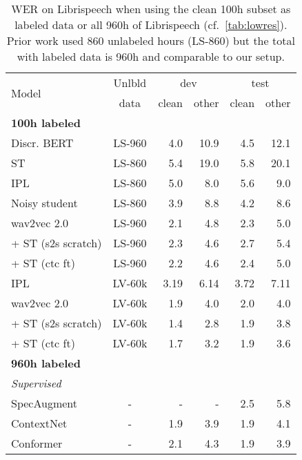 \documentclass{article}
\newcommand{\wvpp}{wav2vec 2.0}
\newcommand{\libri}{Librispeech}
\newcommand{\voxsz}{LV-60k}
\newcommand{\librisz}{LS-960}
\newcommand{\libriunsz}{LS-860}
\begin{document}
\begin{table}[t]
\centering 
\caption{
WER on \libri{} when using the clean 100h subset as labeled data or all 960h of \libri{} (cf.~\autoref{tab:lowres}).
Prior work used 860 unlabeled hours (LS-860) but the total with labeled data is 960h and comparable to our setup.
}
\label{tab:highres}
\begin{tabular}{lcrrrr}
\toprule
\multirow{2}{*}{Model} & Unlbld & \multicolumn{2}{c}{dev} & \multicolumn{2}{c}{test} \\
\cline{3-4}\cline{5-6} 
{} & data & clean & other & clean & other \\
\midrule
\midrule
\multicolumn{6}{l}{\textbf{100h labeled}} \\
Discr. BERT~\cite{baevski2019effectiveness} & \librisz{} & 4.0 & 10.9 & 4.5 & 12.1 \\
ST~\cite{kahn2020st} & \libriunsz{} & 5.4 & 19.0 & 5.8 & 20.1 \\
IPL~\cite{xu2020iterative} & \libriunsz{} & 5.0 & 8.0 & 5.6 & 9.0 \\
Noisy student~\cite{park2020improved} & \libriunsz{} & 3.9 & 8.8 & 4.2 & 8.6 \\
\wvpp{}~\cite{baevski2020wav}  & \librisz{} & 2.1 & 4.8 & 2.3 & 5.0 \\
\hspace{0.04in}+ ST (s2s scratch)  & \librisz{} &2.3	&4.6	&2.7	&5.4 \\
\hspace{0.04in}+ ST (ctc ft) & \librisz{} & 2.2 & 4.6 & 2.4 & 5.0 \\
\midrule
IPL~\cite{xu2020iterative} & \voxsz{} & 3.19 & 6.14 & 3.72 & 7.11\\
\wvpp{}~\cite{baevski2020wav} & \voxsz{} & 1.9 & 4.0 & 2.0 & 4.0 \\
\hspace{0.04in}+ ST (s2s scratch) & \voxsz{} & 1.4 & 2.8 & 1.9	& 3.8 \\
\hspace{0.04in}+ ST (ctc ft) & \voxsz{} & 1.7 & 3.2 & 1.9 & 3.6 \\
\midrule
\midrule
\multicolumn{6}{l}{\textbf{960h labeled}} \\
 \multicolumn{5}{l}{\emph{Supervised}} \\
SpecAugment~\cite{park2019specaugment} & - & - & - & 2.5 & 5.8 \\
ContextNet~\cite{han2020contextnet} & - & 1.9 & 3.9 & 1.9 & 4.1 \\
Conformer~\cite{gulati2020conformer} & - & 2.1 & 4.3 & 1.9 & 3.9 \\

\end{tabular}
\end{table}
\end{document}
